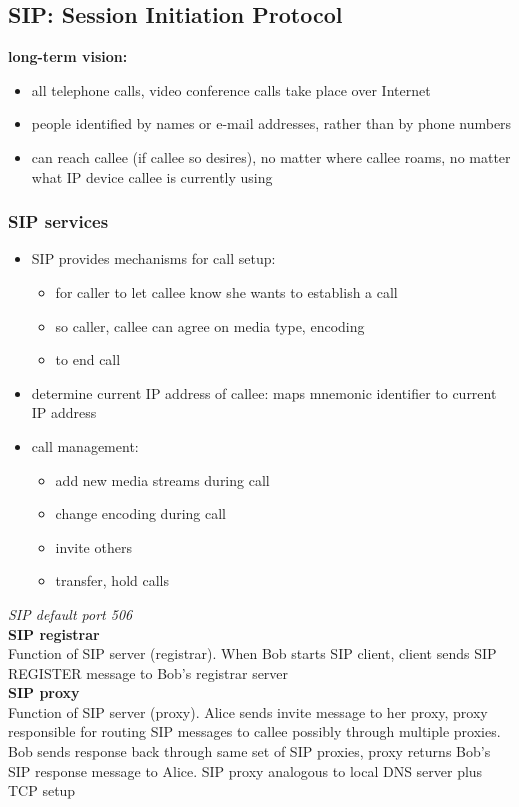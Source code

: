 \subsection{SIP: Session Initiation Protocol}
\textbf{long-term vision:}
\begin{itemize}
	\item all telephone calls, video conference calls take place over Internet
	\item people identified by names or e-mail addresses, rather than by phone numbers
	\item can reach callee (if callee so desires), no matter where callee roams, no matter what IP device callee is currently using
\end{itemize}
\subsubsection{SIP services}
\begin{itemize}
	\item SIP provides mechanisms for call setup:
	\begin{itemize}
		\item for caller to let callee know she wants to establish a call
		\item so caller, callee can agree on media type, encoding
		\item to end call
	\end{itemize}
	\item determine current IP address of callee: maps mnemonic identifier to current IP address
	\item call management:
	\begin{itemize}
		\item add new media streams during call
		\item change encoding during call
		\item invite others
		\item transfer, hold calls
	\end{itemize}
\end{itemize}
\textit{SIP default port 506}\\
\textbf{SIP registrar}\\
Function of SIP server (registrar). When Bob starts SIP client, client sends SIP REGISTER message to Bob's registrar server\\
\textbf{SIP proxy}\\
Function of SIP server (proxy). Alice sends invite message to her proxy, proxy responsible for routing SIP messages to callee possibly through multiple proxies. Bob sends response back through same set of SIP proxies, proxy returns Bob's SIP response message to Alice. SIP proxy analogous to local DNS server plus TCP setup

